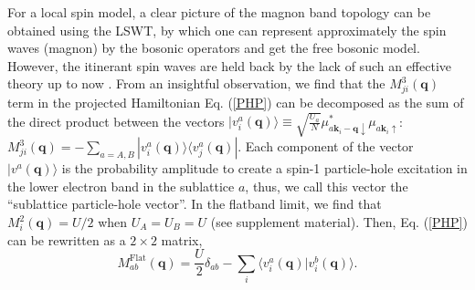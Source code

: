 \documentclass[amsmath,superscriptaddress,showpacs,aps,prl,twocolumn]{revtex4-1}
\begin{document}
\par For a local spin model, a clear picture of the magnon band topology can be obtained using the LSWT, by which one can represent approximately the spin waves (magnon) by the bosonic operators and get the free bosonic model. However, the itinerant spin waves are held back by the lack of such an effective theory up to now \cite{Su_PRB2018}. From an insightful observation, we find that the $M^3_{ji}(\mathbf{q})$ term in the projected Hamiltonian Eq. (\ref{PHP}) can be decomposed as the sum of the direct product between the vectors $|v^a_i(\mathbf{q})\rangle\equiv\sqrt{\frac{U_a}{N}}\mu^{\ast}_{a\mathbf{k}_i-\mathbf{q}\downarrow}\mu_{a\mathbf{k}_{i}\uparrow}$: $M^3_{ji}(\mathbf{q})=-\sum_{a=A,B}|v^a_i(\mathbf{q})\rangle\langle v^a_j(\mathbf{q})|$. Each component of the vector $|v^a(\mathbf{q})\rangle$ is the probability amplitude to create a spin-1 particle-hole excitation in the lower electron band in the sublattice $a$, thus, we call this vector the ``sublattice particle-hole vector''. In the flatband limit, we find that $M^2_i(\mathbf{q})=U/2$ when $U_A=U_B=U$ (see supplement material). Then, Eq. (\ref{PHP}) can be rewritten as a $2\times2$ matrix,
\begin{equation}\label{effective}
M^\text{Flat}_{ab}(\mathbf{q})=\frac{U}{2}\delta_{ab}-\sum_i\langle v_i^a(\mathbf{q})|v_i^b(\mathbf{q})\rangle.
\end{equation}
\end{document}

